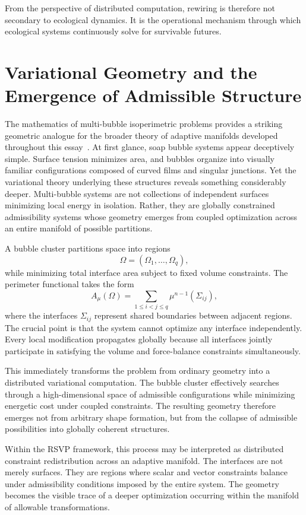 \documentclass[11pt,a4paper]{article}
\begin{document}
From the perspective of distributed computation, rewiring is therefore not secondary to ecological dynamics. It is the operational mechanism through which ecological systems continuously solve for survivable futures.

\newpage

\section{Variational Geometry and the Emergence of Admissible Structure}

The mathematics of multi-bubble isoperimetric problems provides a striking geometric analogue for the broader theory of adaptive manifolds developed throughout this essay~\cite{Milman2025}. At first glance, soap bubble systems appear deceptively simple. Surface tension minimizes area, and bubbles organize into visually familiar configurations composed of curved films and singular junctions. Yet the variational theory underlying these structures reveals something considerably deeper. Multi-bubble systems are not collections of independent surfaces minimizing local energy in isolation. Rather, they are globally constrained admissibility systems whose geometry emerges from coupled optimization across an entire manifold of possible partitions.

A bubble cluster partitions space into regions
\[
\Omega=(\Omega_1,\dots,\Omega_q),
\]
while minimizing total interface area subject to fixed volume constraints. The perimeter functional takes the form
\[
A_\mu(\Omega)
=
\sum_{1\le i<j\le q}
\mu^{n-1}(\Sigma_{ij}),
\]
where the interfaces $\Sigma_{ij}$ represent shared boundaries between adjacent regions. The crucial point is that the system cannot optimize any interface independently. Every local modification propagates globally because all interfaces jointly participate in satisfying the volume and force-balance constraints simultaneously.

This immediately transforms the problem from ordinary geometry into a distributed variational computation. The bubble cluster effectively searches through a high-dimensional space of admissible configurations while minimizing energetic cost under coupled constraints. The resulting geometry therefore emerges not from arbitrary shape formation, but from the collapse of admissible possibilities into globally coherent structures.

Within the RSVP framework, this process may be interpreted as distributed constraint redistribution across an adaptive manifold. The interfaces are not merely surfaces. They are regions where scalar and vector constraints balance under admissibility conditions imposed by the entire system. The geometry becomes the visible trace of a deeper optimization occurring within the manifold of allowable transformations.
\end{document}
